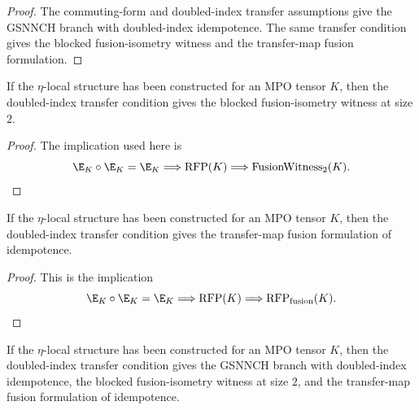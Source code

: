 \begin{proof}\leanok
    The commuting-form and doubled-index transfer assumptions give the GSNNCH
    branch with doubled-index idempotence. The same transfer condition gives
    the blocked fusion-isometry witness and the transfer-map fusion formulation.
\end{proof}

\begin{lemma}
    \label{lem:eta_local_structure_fusion_isometry_two}
    \leanok
    If the $\eta$-local structure has been constructed for an MPO tensor $K$,
    then the doubled-index transfer condition gives the blocked
    fusion-isometry witness at size $2$.
\end{lemma}

\begin{proof}\leanok
    The implication used here is
    \[
        \E_K\circ\E_K=\E_K
        \Longrightarrow \operatorname{RFP}(K)
        \Longrightarrow \operatorname{FusionWitness}_{2}(K).
    \]
\end{proof}

\begin{lemma}
    \label{lem:eta_local_structure_rfp_via_fusion}
    \leanok
    If the $\eta$-local structure has been constructed for an MPO tensor $K$,
    then the doubled-index transfer condition gives the transfer-map fusion
    formulation of idempotence.
\end{lemma}

\begin{proof}\leanok
    This is the implication
    \[
        \E_K\circ\E_K=\E_K
        \Longrightarrow \operatorname{RFP}(K)
        \Longrightarrow \operatorname{RFP}_{\mathrm{fusion}}(K).
    \]
\end{proof}

\begin{theorem}
    \label{thm:simple_mpdo_rfp_chain_of_eta_local_structure}
    \leanok
    If the $\eta$-local structure has been constructed for an
    MPO tensor $K$, then the doubled-index transfer condition gives the
    GSNNCH branch with doubled-index idempotence, the blocked fusion-isometry
    witness at size $2$, and the transfer-map fusion formulation of
    idempotence.
\end{theorem}

